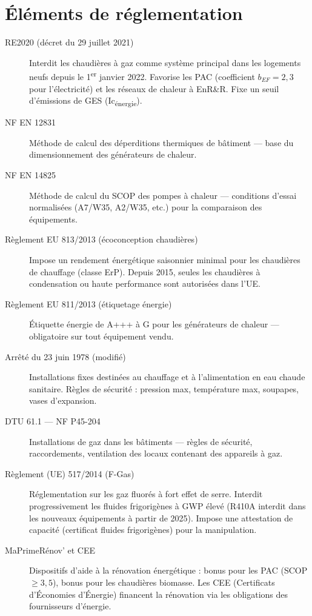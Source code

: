\section{Éléments de réglementation}

\begin{description}
  \item[RE2020 (décret du 29 juillet 2021)] Interdit les chaudières à gaz comme système principal dans les logements neufs depuis le 1\textsuperscript{er} janvier 2022. Favorise les PAC (coefficient $b_{EF} = 2{,}3$ pour l'électricité) et les réseaux de chaleur à EnR\&R. Fixe un seuil d'émissions de GES (Ic\textsubscript{énergie}).

  \item[NF EN 12831] Méthode de calcul des déperditions thermiques de bâtiment — base du dimensionnement des générateurs de chaleur.

  \item[NF EN 14825] Méthode de calcul du SCOP des pompes à chaleur — conditions d'essai normalisées (A7/W35, A2/W35, etc.) pour la comparaison des équipements.

  \item[Règlement EU 813/2013 (écoconception chaudières)] Impose un rendement énergétique saisonnier minimal pour les chaudières de chauffage (classe ErP). Depuis 2015, seules les chaudières à condensation ou haute performance sont autorisées dans l'UE.

  \item[Règlement EU 811/2013 (étiquetage énergie)] Étiquette énergie de A+++ à G pour les générateurs de chaleur — obligatoire sur tout équipement vendu.

  \item[Arrêté du 23 juin 1978 (modifié)] Installations fixes destinées au chauffage et à l'alimentation en eau chaude sanitaire. Règles de sécurité : pression max, température max, soupapes, vases d'expansion.

  \item[DTU 61.1 — NF P45-204] Installations de gaz dans les bâtiments — règles de sécurité, raccordements, ventilation des locaux contenant des appareils à gaz.

  \item[Règlement (UE) 517/2014 (F-Gas)] Réglementation sur les gaz fluorés à fort effet de serre. Interdit progressivement les fluides frigorigènes à GWP élevé (R410A interdit dans les nouveaux équipements à partir de 2025). Impose une attestation de capacité (certificat fluides frigorigènes) pour la manipulation.

  \item[MaPrimeRénov' et CEE] Dispositifs d'aide à la rénovation énergétique : bonus pour les PAC (SCOP $\geq 3{,}5$), bonus pour les chaudières biomasse. Les CEE (Certificats d'Économies d'Énergie) financent la rénovation via les obligations des fournisseurs d'énergie.
\end{description}

